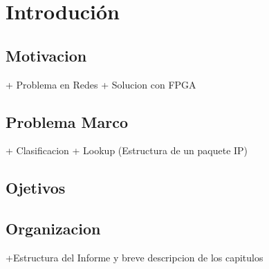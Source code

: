 \chapter{Introdución}

\section{Motivacion}

+ Problema en Redes
+ Solucion con FPGA

\section{Problema Marco}

+ Clasificacion
+ Lookup (Estructura de un paquete IP)

\section{Ojetivos}
\section{Organizacion}
+Estructura del Informe y breve descripcion de los capitulos





